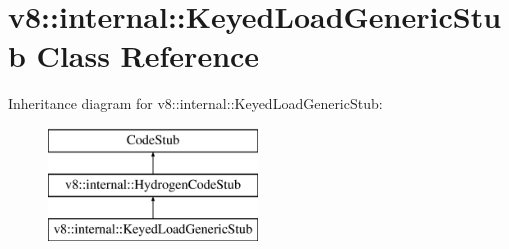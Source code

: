 \hypertarget{classv8_1_1internal_1_1_keyed_load_generic_stub}{}\section{v8\+:\+:internal\+:\+:Keyed\+Load\+Generic\+Stub Class Reference}
\label{classv8_1_1internal_1_1_keyed_load_generic_stub}
Inheritance diagram for v8\+:\+:internal\+:\+:Keyed\+Load\+Generic\+Stub\+:\begin{figure}[H]
\begin{center}
\leavevmode
\includegraphics[height=3.000000cm]{classv8_1_1internal_1_1_keyed_load_generic_stub}
\end{center}
\end{figure}

